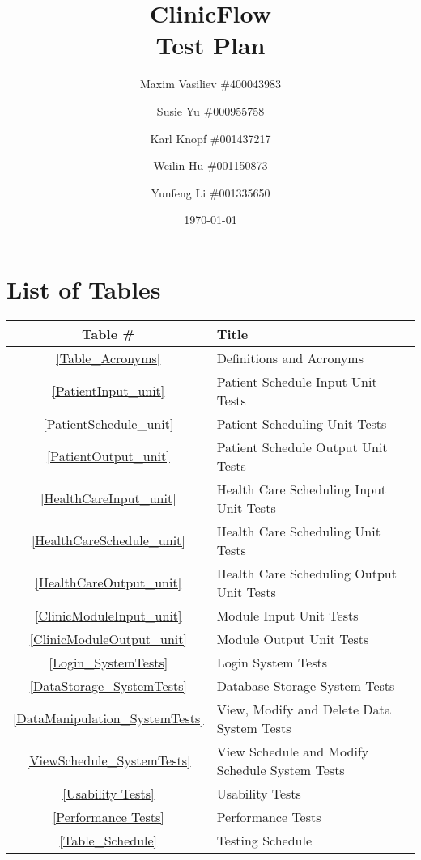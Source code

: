 \documentclass[12pt]{article}
\title{
ClinicFlow
\\\vspace{10mm}
\large \textbf{Test Plan}
\vspace{40mm}
}
\author{ Maxim Vasiliev \#400043983
\and
Susie Yu \#000955758
\and
Karl Knopf \#001437217
\and
Weilin Hu \#001150873
\and
Yunfeng Li \#001335650
}
\date{\today}
\begin{document}
\maketitle
\newpage
\tableofcontents
\newpage
{}

\section*{List of Tables}

\begin{center}
\begin{tabular}{cl}
\toprule

\bf Table \# & \bf Title\\\midrule

\ref{Table_Acronyms} & Definitions and Acronyms\\
\ref{PatientInput_unit} & Patient Schedule Input Unit Tests \\
\ref{PatientSchedule_unit}& Patient Scheduling Unit Tests\\
\ref{PatientOutput_unit} & Patient Schedule Output Unit Tests \\
\ref{HealthCareInput_unit}& Health Care Scheduling Input Unit Tests\\
\ref{HealthCareSchedule_unit}& Health Care Scheduling Unit Tests \\
\ref{HealthCareOutput_unit}& Health Care Scheduling Output Unit Tests \\
\ref{ClinicModuleInput_unit}& Module Input Unit Tests \\
\ref{ClinicModuleOutput_unit} &Module Output Unit Tests \\

\ref{Login_SystemTests} & Login System Tests \\
\ref{DataStorage_SystemTests} & Database Storage System Tests \\
\ref{DataManipulation_SystemTests} & View, Modify and Delete Data System Tests \\
\ref{ViewSchedule_SystemTests} & View Schedule and Modify Schedule System Tests \\
\ref{Usability Tests} & Usability Tests \\
\ref{Performance Tests} & Performance Tests \\
\ref{Table_Schedule} & Testing Schedule \\
\bottomrule
\end{tabular}
\end{center}
\end{document}
